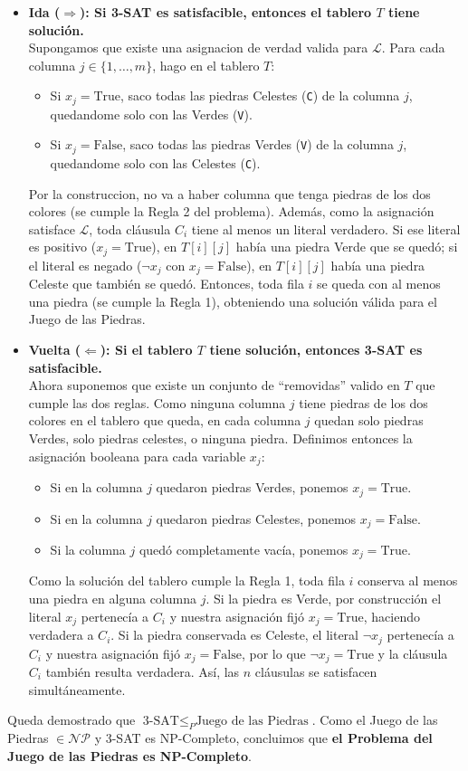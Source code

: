 \begin{itemize}
    \item \textbf{Ida ($\Rightarrow$): Si 3-SAT es satisfacible, entonces el tablero $T$ tiene solución.} \\
    Supongamos que existe una asignacion de verdad valida para $\mathcal{L}$. Para cada columna $j \in \{1, \dots, m\}$, hago en el tablero $T$:
    \begin{itemize}
        \item Si $x_j = \text{True}$, saco todas las piedras Celestes (\texttt{C}) de la columna $j$, quedandome solo con las Verdes (\texttt{V}).
        \item Si $x_j = \text{False}$, saco todas las piedras Verdes (\texttt{V}) de la columna $j$, quedandome solo con las Celestes (\texttt{C}).
    \end{itemize}
    Por la construccion, no va a haber columna que tenga piedras de los dos colores (se cumple la Regla 2 del problema). Además, como la asignación satisface $\mathcal{L}$, toda cláusula $C_i$ tiene al menos un literal verdadero. Si ese literal es positivo ($x_j = \text{True}$), en $T[i][j]$ había una piedra Verde que se quedó; si el literal es negado ($\neg x_j$ con $x_j = \text{False}$), en $T[i][j]$ había una piedra Celeste que también se quedó. Entonces, toda fila $i$ se queda con al menos una piedra (se cumple la Regla 1), obteniendo una solución válida para el Juego de las Piedras.

    \item \textbf{Vuelta ($\Leftarrow$): Si el tablero $T$ tiene solución, entonces 3-SAT es satisfacible.} \\
    Ahora suponemos que existe un conjunto de ``removidas'' valido en $T$ que cumple las dos reglas. Como ninguna columna $j$ tiene piedras de los dos colores en el tablero que queda, en cada columna $j$ quedan solo piedras Verdes, solo piedras celestes, o ninguna piedra. Definimos entonces la asignación booleana para cada variable $x_j$:
    \begin{itemize}
        \item Si en la columna $j$ quedaron piedras Verdes, ponemos $x_j = \text{True}$.
        \item Si en la columna $j$ quedaron piedras Celestes, ponemos $x_j = \text{False}$.
        \item Si la columna $j$ quedó completamente vacía, ponemos $x_j = \text{True}$.
    \end{itemize}
    Como la solución del tablero cumple la Regla 1, toda fila $i$ conserva al menos una piedra en alguna columna $j$. Si la piedra es Verde, por construcción el literal $x_j$ pertenecía a $C_i$ y nuestra asignación fijó $x_j = \text{True}$, haciendo verdadera a $C_i$. Si la piedra conservada es Celeste, el literal $\neg x_j$ pertenecía a $C_i$ y nuestra asignación fijó $x_j = \text{False}$, por lo que $\neg x_j = \text{True}$ y la cláusula $C_i$ también resulta verdadera. Así, las $n$ cláusulas se satisfacen simultáneamente.
\end{itemize}

Queda demostrado que $\text{3-SAT} \leq_P \text{Juego de las Piedras}$. Como el Juego de las Piedras $\in \mathcal{NP}$ y 3-SAT es NP-Completo, concluimos que \textbf{el Problema del Juego de las Piedras es NP-Completo}.







